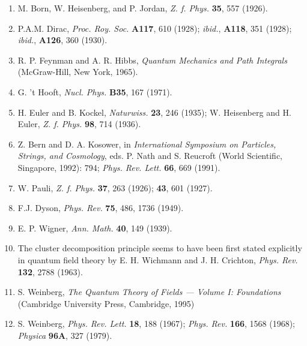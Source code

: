 \documentclass[12pt]{article}
\begin{document}
\begin{enumerate}

\item M. Born, W. Heisenberg, and P. Jordan, {\it Z. f.
Phys.} {\bf 35}, 557 (1926).

\item P.A.M. Dirac, {\it Proc. Roy. Soc.}   {\bf A117}, 610
(1928); {\it ibid.}, {\bf A118}, 351 (1928); {\it ibid.},
{\bf A126}, 360 (1930).

\item R. P. Feynman and A. R. Hibbs, {\it Quantum Mechanics
and Path Integrals} (McGraw-Hill, New York, 1965).

\item G. 't Hooft, {\em Nucl. Phys.} {\bf B35}, 167 (1971).

\item H. Euler and B. Kockel, {\it Naturwiss.} {\bf 23}, 246
(1935); W. Heisenberg and H. Euler,  {\it Z. f. Phys.} {\bf
98}, 714 (1936).



\item Z. Bern and D. A. Kosower, in {\em International
Symposium on Particles, Strings, and Cosmology}, eds. P.
Nath and S. Reucroft (World Scientific, Singapore, 1992):
794; {\it Phys. Rev. Lett.} {\bf 66}, 669 (1991).

\item W. Pauli, {\it Z. f. Phys.} {\bf 37}, 263 (1926); {\bf
43}, 601 (1927).

\item F.J. Dyson, {\it Phys. Rev.} {\bf 75}, 486, 1736
(1949).

\item E. P. Wigner, {\it Ann. Math.} {\bf 40}, 149 (1939).

\item The cluster decomposition principle seems to have been
first stated explicitly in quantum field theory by E. H.
Wichmann and J. H. Crichton, {\it Phys. Rev.} {\bf 132},
2788 (1963).

\item S. Weinberg, {\em The Quantum Theory  of Fields ---
Volume I:
Foundations}~
(Cambridge University Press, Cambridge, 1995)

\item S. Weinberg, {\em Phys. Rev. Lett.} {\bf 18}, 188
(1967); {\it Phys. Rev.} {\bf 166}, 1568 (1968); {\it
Physica} {\bf 96A}, 327 (1979).


\end{enumerate}
\end{document}
